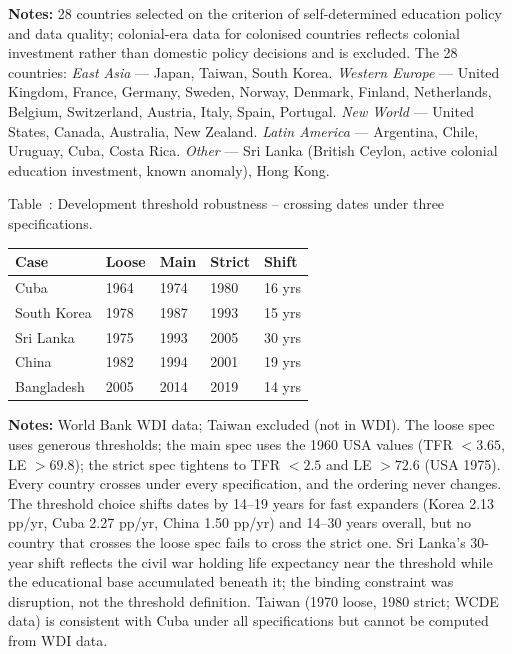 \documentclass[12pt,letterpaper]{article}
\begin{document}
{\begin{minipage}{\dimexpr\textwidth-2em}
\scriptsize
\textbf{Notes:} 28 countries selected on the criterion of
self-determined education policy and data quality; colonial-era data
for colonised countries reflects colonial investment rather than
domestic policy decisions and is excluded. The 28 countries: \emph{East
Asia} --- Japan, Taiwan, South Korea. \emph{Western Europe} --- United
Kingdom, France, Germany, Sweden, Norway, Denmark, Finland, Netherlands,
Belgium, Switzerland, Austria, Italy, Spain, Portugal. \emph{New World}
--- United States, Canada, Australia, New Zealand. \emph{Latin America}
--- Argentina, Chile, Uruguay, Cuba, Costa Rica. \emph{Other} --- Sri
Lanka (British Ceylon, active colonial education investment, known
anomaly), Hong Kong.
\end{minipage}

\label{tab:a4}Table~\thetable: Development threshold robustness -- crossing dates under three specifications.

\begin{longtable}[]{@{}lllll@{}}
\toprule
Case & Loose & Main & Strict & Shift \\
\midrule
\endhead
Cuba & 1964 & 1974 & 1980 & 16 yrs \\
South Korea & 1978 & 1987 & 1993 & 15 yrs \\
Sri Lanka & 1975 & 1993 & 2005 & 30 yrs \\
China & 1982 & 1994 & 2001 & 19 yrs \\
Bangladesh & 2005 & 2014 & 2019 & 14 yrs \\
\bottomrule
\end{longtable}

\begin{minipage}{\dimexpr\textwidth-2em}
\scriptsize
\textbf{Notes:} World Bank WDI data; Taiwan excluded (not in WDI).
The loose spec uses generous thresholds; the main spec uses the 1960
USA values (TFR $<3.65$, LE $>69.8$); the strict spec tightens to TFR
$<2.5$ and LE $>72.6$ (USA 1975). Every country crosses under every
specification, and the ordering never changes. The threshold choice
shifts dates by 14--19 years for fast expanders (Korea 2.13 pp/yr,
Cuba 2.27 pp/yr, China 1.50 pp/yr) and 14--30 years overall, but no
country that crosses the loose spec fails to cross the strict one.
Sri Lanka's 30-year shift reflects the civil war holding life
expectancy near the threshold while the educational base accumulated
beneath it; the binding constraint was disruption, not the threshold
definition. Taiwan (1970 loose, 1980 strict; WCDE data) is consistent
with Cuba under all specifications but cannot be computed from WDI
data.
\end{minipage}

}
\end{document}

